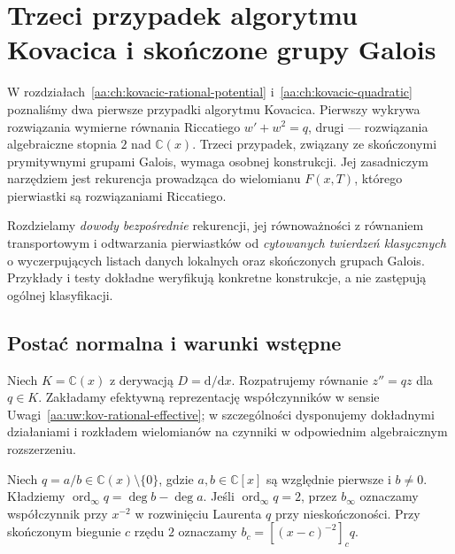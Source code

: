 \chapter{Trzeci przypadek algorytmu Kovacica i skończone grupy Galois}
\label{aa:ch:kovacic-finite-groups}

W rozdziałach~\ref{aa:ch:kovacic-rational-potential}
i~\ref{aa:ch:kovacic-quadratic} poznaliśmy dwa
pierwsze przypadki algorytmu Kovacica.
Pierwszy wykrywa rozwiązania wymierne
równania Riccatiego $w'+w^2=q$,
drugi --- rozwiązania algebraiczne stopnia $2$
nad $\mathbb C(x)$. Trzeci przypadek,
związany ze skończonymi prymitywnymi
grupami Galois, wymaga osobnej konstrukcji.
Jej zasadniczym narzędziem jest
rekurencja prowadząca do wielomianu
$F(x,T)$, którego pierwiastki są
rozwiązaniami Riccatiego.

Rozdzielamy \emph{dowody bezpośrednie}
rekurencji, jej równoważności z
równaniem transportowym i
odtwarzania pierwiastków od
\emph{cytowanych twierdzeń klasycznych}
o wyczerpujących listach danych lokalnych
oraz skończonych grupach Galois.
Przykłady i testy dokładne weryfikują
konkretne konstrukcje, a nie zastępują
ogólnej klasyfikacji.

\section{Postać normalna i warunki wstępne}

Niech $K=\mathbb C(x)$ z derywacją
$D=\mathrm d/\mathrm dx$.
Rozpatrujemy równanie $z''=qz$
dla $q\in K$. Zakładamy
efektywną reprezentację współczynników
w sensie
Uwagi~\ref{aa:uw:kov-rational-effective};
w szczególności dysponujemy dokładnymi
działaniami i rozkładem wielomianów
na czynniki w odpowiednim
algebraicznym rozszerzeniu.

\begin{definicja}
\label{aa:def:kov3-infinity-order}
Niech $q=a/b\in\mathbb C(x)\setminus\{0\}$,
gdzie $a,b\in\mathbb C[x]$ są względnie
pierwsze i $b\ne0$.
Kładziemy
$\operatorname{ord}_{\infty}q=\deg b-\deg a$.
Jeśli $\operatorname{ord}_{\infty}q=2$,
przez $b_\infty$ oznaczamy współczynnik
przy $x^{-2}$ w rozwinięciu
Laurenta $q$ przy nieskończoności.
Przy skończonym biegunie $c$ rzędu $2$
oznaczamy
$b_c=[(x-c)^{-2}]_c q$.
\end{definicja}

